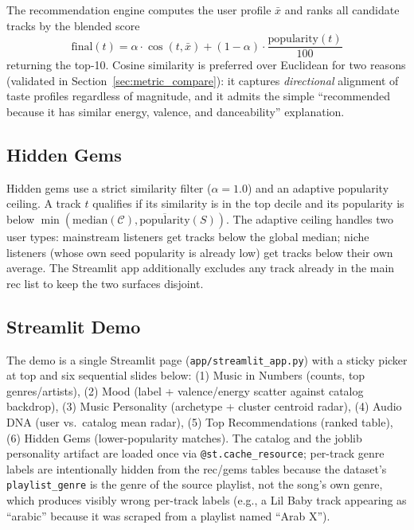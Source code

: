 \documentclass[letterpaper, 10 pt, conference]{ieeeconf}
\begin{document}
The recommendation engine computes the user profile $\bar{x}$ and ranks all candidate tracks by the blended score
\begin{equation}
\text{final}(t) = \alpha \cdot \cos(t, \bar{x}) + (1-\alpha)\cdot \frac{\text{popularity}(t)}{100}
\end{equation}
returning the top-10. Cosine similarity is preferred over Euclidean for two reasons (validated in Section~\ref{sec:metric_compare}): it captures \emph{directional} alignment of taste profiles regardless of magnitude, and it admits the simple ``recommended because it has similar energy, valence, and danceability'' explanation.

\subsection{Hidden Gems}

Hidden gems use a strict similarity filter ($\alpha{=}1.0$) and an adaptive popularity ceiling. A track $t$ qualifies if its similarity is in the top decile and its popularity is below $\min(\text{median}(\mathcal{C}), \overline{\text{popularity}}(S))$. The adaptive ceiling handles two user types: mainstream listeners get tracks below the global median; niche listeners (whose own seed popularity is already low) get tracks below their own average. The Streamlit app additionally excludes any track already in the main rec list to keep the two surfaces disjoint.

\subsection{Streamlit Demo}

The demo is a single Streamlit page (\texttt{app/streamlit\_app.py}) with a sticky picker at top and six sequential slides below: (1) Music in Numbers (counts, top genres/artists), (2) Mood (label + valence/energy scatter against catalog backdrop), (3) Music Personality (archetype + cluster centroid radar), (4) Audio DNA (user vs.\ catalog mean radar), (5) Top Recommendations (ranked table), (6) Hidden Gems (lower-popularity matches). The catalog and the joblib personality artifact are loaded once via \texttt{@st.cache\_resource}; per-track genre labels are intentionally hidden from the rec/gems tables because the dataset's \texttt{playlist\_genre} is the genre of the source playlist, not the song's own genre, which produces visibly wrong per-track labels (e.g., a Lil Baby track appearing as ``arabic'' because it was scraped from a playlist named ``Arab X'').
\end{document}
